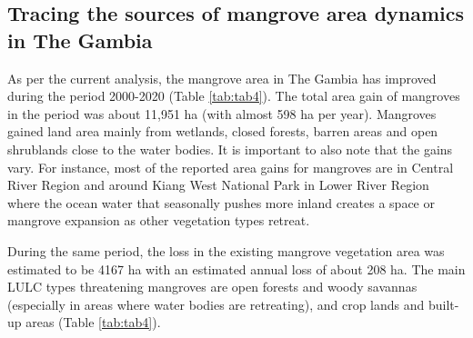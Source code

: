 \documentclass[utf8]{frontiersSCNS}
\begin{document}
\hypertarget{ref43}{%
\subsection{Tracing the sources of mangrove area dynamics in The
Gambia}\label{ref43}}

As per the current analysis, the mangrove area in The Gambia has
improved during the period 2000-2020 (Table \ref{tab:tab4}). The total
area gain of mangroves in the period was about 11,951 ha (with almost
598 ha per year). Mangroves gained land area mainly from wetlands,
closed forests, barren areas and open shrublands close to the water
bodies. It is important to also note that the gains vary. For instance,
most of the reported area gains for mangroves are in Central River
Region and around Kiang West National Park in Lower River Region where
the ocean water that seasonally pushes more inland creates a space or
mangrove expansion as other vegetation types retreat.

During the same period, the loss in the existing mangrove vegetation
area was estimated to be 4167 ha with an estimated annual loss of about
208 ha. The main LULC types threatening mangroves are open forests and
woody savannas (especially in areas where water bodies are retreating),
and crop lands and built-up areas (Table \ref{tab:tab4}).
\end{document}
